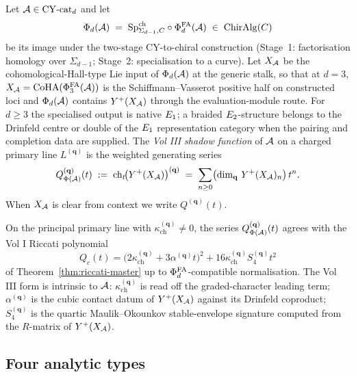 \begin{definition}
\label{def:vol3-shadow-function}
Let $\mathcal{A} \in \mathrm{CY}\text{-}\mathrm{cat}_{d}$ and let
\[
  \Phi_{d}(\mathcal{A}) \;=\; \mathrm{Sp}^{\mathrm{ch}}_{\Sigma_{d-1},C} \circ \Phi^{\mathrm{FA}}_{d}(\mathcal{A})
  \;\in\; \mathrm{ChirAlg}(C)
\]
be its image under the two-stage CY-to-chiral construction (Stage~1:
factorisation homology over $\Sigma_{d-1}$; Stage~2: specialisation to
a curve). Let $X_{\mathcal{A}}$ be the cohomological-Hall-type Lie input of
$\Phi_{d}(\mathcal{A})$ at the generic stalk, so that at $d = 3$,
$X_{\mathcal{A}} = \mathrm{CoHA}(\Phi^{\mathrm{FA}}_{3}(\mathcal{A}))$ is the Schiffmann--Vasserot positive
half on constructed loci and $\Phi_{d}(\mathcal{A})$ contains
$Y^{+}(X_{\mathcal{A}})$ through the evaluation-module route. For $d \geq 3$
the specialised output is native $E_1$; a braided $E_2$-structure
belongs to the Drinfeld centre or double of the $E_1$ representation
category when the pairing and completion data are supplied. The
\emph{Vol III shadow function} of $\mathcal{A}$
on a charged primary line $L^{(\mathbf q)}$ is the weighted generating
series
\[
  Q^{(\mathbf q)}_{\Phi(\mathcal{A})}(t)
  \;:=\; \operatorname{ch}_{t}\!\bigl(Y^{+}(X_{\mathcal{A}})\bigr)^{(\mathbf q)}
  \;=\; \sum_{n \ge 0} \bigl(\dim_{\mathbf q}\,Y^{+}(X_{\mathcal{A}})_{n}\bigr)\,
                              t^{n}.
\]
When $X_{\mathcal{A}}$ is clear from context we write $Q^{(\mathbf q)}(t)$.
\end{definition}

\begin{remark}
\label{rem:vol3-shadow-compat-vol1}
On the principal primary line with $\kappa_{\mathrm{ch}}^{(\mathbf q)} \neq 0$, the
series $Q^{(\mathbf q)}_{\Phi(\mathcal{A})}(t)$ agrees with the Vol I Riccati
polynomial
\[
  Q_{c}(t) =
  \bigl(2\kappa_{\mathrm{ch}}^{(\mathbf q)} + 3\alpha^{(\mathbf q)} t\bigr)^2
  + 16\kappa_{\mathrm{ch}}^{(\mathbf q)} S_{4}^{(\mathbf q)} t^2
\]
of Theorem~\ref{thm:riccati-master} up to
$\Phi^{\mathrm{FA}}_{d}$-compatible normalisation. The Vol III form is intrinsic
to $\mathcal{A}$: $\kappa_{\mathrm{ch}}^{(\mathbf q)}$ is read off the
graded-character leading term; $\alpha^{(\mathbf q)}$ is the cubic contact datum of
$Y^{+}(X_{\mathcal{A}})$ against its Drinfeld coproduct; $S_{4}^{(\mathbf q)}$
is the quartic Maulik--Okounkov stable-envelope signature computed
from the $R$-matrix of $Y^{+}(X_{\mathcal{A}})$.
\end{remark}

\subsection{Four analytic types}
\label{subsec:four-analytic-types}

